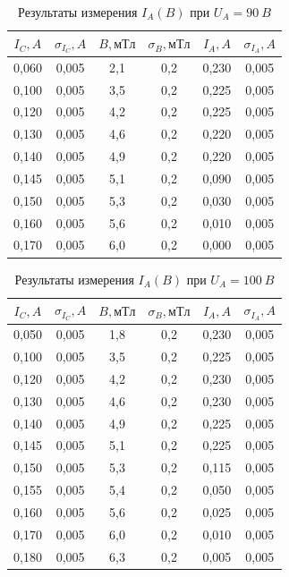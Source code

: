 \documentclass[a4paper, 12pt]{article}
\begin{document}
\begin{table}[h!]
\begin{center}
\begin{tabular}{|c|c|c|c|c|c|}
\hline
$I_C, A$ & $\sigma_{I_C}, A$ & $B, мТл$ & $\sigma_{B}, мТл$ & $I_A, A$ & $\sigma_{I_A}, A$ \\ \hline
0,060 & 0,005  & 2,1    & 0,2     & 0,230 & 0,005  \\ \hline
0,100 & 0,005  & 3,5    & 0,2     & 0,225 & 0,005  \\ \hline
0,120 & 0,005  & 4,2    & 0,2     & 0,225 & 0,005  \\ \hline
0,130 & 0,005  & 4,6    & 0,2     & 0,220 & 0,005  \\ \hline
0,140 & 0,005  & 4,9    & 0,2     & 0,220 & 0,005  \\ \hline
0,145 & 0,005  & 5,1    & 0,2     & 0,090 & 0,005  \\ \hline
0,150 & 0,005  & 5,3    & 0,2     & 0,030 & 0,005  \\ \hline
0,160 & 0,005  & 5,6    & 0,2     & 0,010 & 0,005  \\ \hline
0,170 & 0,005  & 6,0    & 0,2     & 0,000 & 0,005  \\ \hline
\end{tabular}
\end{center}
\caption{Результаты измерения $I_A(B)$ при $U_A = 90~B$}
\label{tab7}
\end{table}

\begin{table}[h!]
\begin{center}
\begin{tabular}{|c|c|c|c|c|c|}
\hline
$I_C, A$ & $\sigma_{I_C}, A$ & $B, мТл$ & $\sigma_{B}, мТл$ & $I_A, A$ & $\sigma_{I_A}, A$ \\ \hline
0,050 & 0,005  & 1,8    & 0,2     & 0,230 & 0,005  \\ \hline
0,100 & 0,005  & 3,5    & 0,2     & 0,225 & 0,005  \\ \hline
0,120 & 0,005  & 4,2    & 0,2     & 0,230 & 0,005  \\ \hline
0,130 & 0,005  & 4,6    & 0,2     & 0,230 & 0,005  \\ \hline
0,140 & 0,005  & 4,9    & 0,2     & 0,225 & 0,005  \\ \hline
0,145 & 0,005  & 5,1    & 0,2     & 0,225 & 0,005  \\ \hline
0,150 & 0,005  & 5,3    & 0,2     & 0,115 & 0,005  \\ \hline
0,155 & 0,005  & 5,4    & 0,2     & 0,050 & 0,005  \\ \hline
0,160 & 0,005  & 5,6    & 0,2     & 0,025 & 0,005  \\ \hline
0,170 & 0,005  & 6,0    & 0,2     & 0,010 & 0,005  \\ \hline
0,180 & 0,005  & 6,3    & 0,2     & 0,005 & 0,005  \\ \hline
\end{tabular}
\end{center}
\caption{Результаты измерения $I_A(B)$ при $U_A = 100~B$}
\label{tab8}
\end{table}
\end{document}
